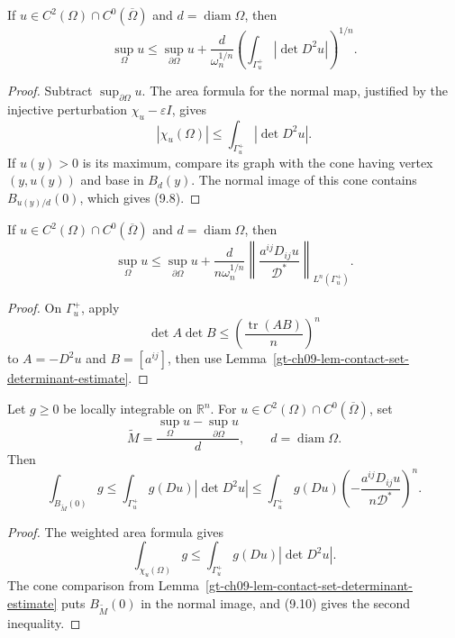 \begin{lemma}
\label{gt-ch09-lem-contact-set-determinant-estimate}
If $u\in C^2(\Omega)\cap C^0(\overline\Omega)$ and
$d=\operatorname{diam}\Omega$, then
\begin{equation}\tag{9.8}
\sup_\Omega u\le\sup_{\partial\Omega}u+
\frac d{\omega_n^{1/n}}
\left(\int_{\Gamma_u^+}|\det D^2u|\right)^{1/n}.
\end{equation}
\end{lemma}
\begin{proof}
\sketch Subtract $\sup_{\partial\Omega}u$.  The area formula for the normal
map, justified by the injective perturbation $\chi_u-\varepsilon I$, gives
\begin{equation}\tag{9.9}
|\chi_u(\Omega)|\le\int_{\Gamma_u^+}|\det D^2u|.
\end{equation}
If $u(y)>0$ is its maximum, compare its graph with the cone having vertex
$(y,u(y))$ and base in $B_d(y)$.  The normal image of this cone contains
$B_{u(y)/d}(0)$, which gives (9.8).
\end{proof}

\begin{lemma}
\label{gt-ch09-lem-contact-set-principal-part}
If $u\in C^2(\Omega)\cap C^0(\overline\Omega)$ and
$d=\operatorname{diam}\Omega$, then
\begin{equation}\tag{9.11}
\sup_\Omega u\le\sup_{\partial\Omega}u+
\frac d{n\omega_n^{1/n}}
\left\|\frac{a^{ij}D_{ij}u}{\mathcal D^*}\right\|_{L^n(\Gamma_u^+)}.
\end{equation}
\end{lemma}
\begin{proof}
\sketch On $\Gamma_u^+$, apply
\[
\det A\det B\le\left(\frac{\operatorname{tr}(AB)}n\right)^n
\tag{9.10}
\]
to $A=-D^2u$ and $B=[a^{ij}]$, then use
Lemma~\ref{gt-ch09-lem-contact-set-determinant-estimate}.
\end{proof}

\begin{lemma}
\label{gt-ch09-lem-weighted-contact-set}
Let $g\ge0$ be locally integrable on $\mathbb R^n$.  For
$u\in C^2(\Omega)\cap C^0(\overline\Omega)$, set
\[
\widetilde M=
\frac{\sup_\Omega u-\sup_{\partial\Omega}u}{d},
\qquad d=\operatorname{diam}\Omega.
\]
Then
\begin{equation}\tag{9.12}
\int_{B_{\widetilde M}(0)}g
\le\int_{\Gamma_u^+}g(Du)|\det D^2u|
\le\int_{\Gamma_u^+}g(Du)
\left(-\frac{a^{ij}D_{ij}u}{n\mathcal D^*}\right)^n.
\end{equation}
\end{lemma}
\begin{proof}
\sketch The weighted area formula gives
\[
\int_{\chi_u(\Omega)}g
\le\int_{\Gamma_u^+}g(Du)|\det D^2u|.\tag{9.13}
\]
The cone comparison from Lemma~\ref{gt-ch09-lem-contact-set-determinant-estimate}
puts $B_{\widetilde M}(0)$ in the normal image, and (9.10) gives the second
inequality.
\end{proof}

